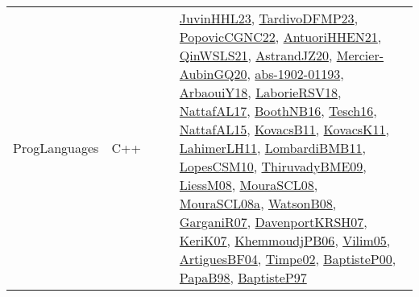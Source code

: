 {\begin{longtable}{lp{3cm}>{\raggedright}p{6cm}>{\raggedright}p{6cm}p{8cm}}
ProgLanguages & C++ &  &  & \href{papers/JuvinHHL23.pdf}{JuvinHHL23}\cite{JuvinHHL23}, \href{papers/TardivoDFMP23.pdf}{TardivoDFMP23}\cite{TardivoDFMP23}, \href{papers/PopovicCGNC22.pdf}{PopovicCGNC22}\cite{PopovicCGNC22}, \href{papers/AntuoriHHEN21.pdf}{AntuoriHHEN21}\cite{AntuoriHHEN21}, \href{articles/QinWSLS21.pdf}{QinWSLS21}\cite{QinWSLS21}, \href{articles/AstrandJZ20.pdf}{AstrandJZ20}\cite{AstrandJZ20}, \href{papers/Mercier-AubinGQ20.pdf}{Mercier-AubinGQ20}\cite{Mercier-AubinGQ20}, \href{articles/abs-1902-01193.pdf}{abs-1902-01193}\cite{abs-1902-01193}, \href{papers/ArbaouiY18.pdf}{ArbaouiY18}\cite{ArbaouiY18}, \href{articles/LaborieRSV18.pdf}{LaborieRSV18}\cite{LaborieRSV18}, \href{articles/NattafAL17.pdf}{NattafAL17}\cite{NattafAL17}, \href{papers/BoothNB16.pdf}{BoothNB16}\cite{BoothNB16}, \href{papers/Tesch16.pdf}{Tesch16}\cite{Tesch16}, \href{articles/NattafAL15.pdf}{NattafAL15}\cite{NattafAL15}, \href{articles/KovacsB11.pdf}{KovacsB11}\cite{KovacsB11}, \href{articles/KovacsK11.pdf}{KovacsK11}\cite{KovacsK11}, \href{papers/LahimerLH11.pdf}{LahimerLH11}\cite{LahimerLH11}, \href{papers/LombardiBMB11.pdf}{LombardiBMB11}\cite{LombardiBMB11}, \href{articles/LopesCSM10.pdf}{LopesCSM10}\cite{LopesCSM10}, \href{papers/ThiruvadyBME09.pdf}{ThiruvadyBME09}\cite{ThiruvadyBME09}, \href{articles/LiessM08.pdf}{LiessM08}\cite{LiessM08}, \href{papers/MouraSCL08.pdf}{MouraSCL08}\cite{MouraSCL08}, \href{papers/MouraSCL08a.pdf}{MouraSCL08a}\cite{MouraSCL08a}, \href{papers/WatsonB08.pdf}{WatsonB08}\cite{WatsonB08}, \href{papers/GarganiR07.pdf}{GarganiR07}\cite{GarganiR07}, \href{papers/DavenportKRSH07.pdf}{DavenportKRSH07}\cite{DavenportKRSH07}, \href{papers/KeriK07.pdf}{KeriK07}\cite{KeriK07}, \href{papers/KhemmoudjPB06.pdf}{KhemmoudjPB06}\cite{KhemmoudjPB06}, \href{papers/Vilim05.pdf}{Vilim05}\cite{Vilim05}, \href{papers/ArtiguesBF04.pdf}{ArtiguesBF04}\cite{ArtiguesBF04}, \href{articles/Timpe02.pdf}{Timpe02}\cite{Timpe02}, \href{articles/BaptisteP00.pdf}{BaptisteP00}\cite{BaptisteP00}, \href{articles/PapaB98.pdf}{PapaB98}\cite{PapaB98}, \href{papers/BaptisteP97.pdf}{BaptisteP97}\cite{BaptisteP97}\\

\end{longtable}}
